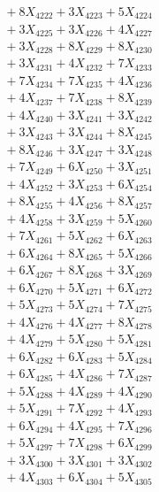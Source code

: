 \documentclass[a4paper,10pt]{article}
\begin{document}
{\begin{align}
&\;  + 8 X_{4222} + 3 X_{4223} + 5 X_{4224} \\[0.3ex]
&\;  + 3 X_{4225} + 3 X_{4226} + 4 X_{4227} \\[0.3ex]
&\;  + 3 X_{4228} + 8 X_{4229} + 8 X_{4230} \\[0.3ex]
&\;  + 3 X_{4231} + 4 X_{4232} + 7 X_{4233} \\[0.3ex]
&\;  + 7 X_{4234} + 7 X_{4235} + 4 X_{4236} \\[0.3ex]
&\;  + 4 X_{4237} + 7 X_{4238} + 8 X_{4239} \\[0.5ex]\allowbreak
&\;  + 4 X_{4240} + 3 X_{4241} + 3 X_{4242} \\[0.3ex]
&\;  + 3 X_{4243} + 3 X_{4244} + 8 X_{4245} \\[0.3ex]
&\;  + 8 X_{4246} + 3 X_{4247} + 3 X_{4248} \\[0.3ex]
&\;  + 7 X_{4249} + 6 X_{4250} + 3 X_{4251} \\[0.3ex]
&\;  + 4 X_{4252} + 3 X_{4253} + 6 X_{4254} \\[0.3ex]
&\;  + 8 X_{4255} + 4 X_{4256} + 8 X_{4257} \\[0.3ex]
&\;  + 4 X_{4258} + 3 X_{4259} + 5 X_{4260} \\[0.3ex]
&\;  + 7 X_{4261} + 5 X_{4262} + 6 X_{4263} \\[0.3ex]
&\;  + 6 X_{4264} + 8 X_{4265} + 5 X_{4266} \\[0.3ex]
&\;  + 6 X_{4267} + 8 X_{4268} + 3 X_{4269} \\[0.5ex]\allowbreak
&\;  + 6 X_{4270} + 5 X_{4271} + 6 X_{4272} \\[0.3ex]
&\;  + 5 X_{4273} + 5 X_{4274} + 7 X_{4275} \\[0.3ex]
&\;  + 4 X_{4276} + 4 X_{4277} + 8 X_{4278} \\[0.3ex]
&\;  + 4 X_{4279} + 5 X_{4280} + 5 X_{4281} \\[0.3ex]
&\;  + 6 X_{4282} + 6 X_{4283} + 5 X_{4284} \\[0.3ex]
&\;  + 6 X_{4285} + 4 X_{4286} + 7 X_{4287} \\[0.3ex]
&\;  + 5 X_{4288} + 4 X_{4289} + 4 X_{4290} \\[0.3ex]
&\;  + 5 X_{4291} + 7 X_{4292} + 4 X_{4293} \\[0.3ex]
&\;  + 6 X_{4294} + 4 X_{4295} + 7 X_{4296} \\[0.3ex]
&\;  + 5 X_{4297} + 7 X_{4298} + 6 X_{4299} \\[0.5ex]\allowbreak
&\;  + 3 X_{4300} + 3 X_{4301} + 3 X_{4302} \\[0.3ex]
&\;  + 4 X_{4303} + 6 X_{4304} + 5 X_{4305} \\[0.3ex]

\end{align}}
\end{document}
